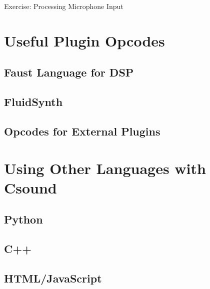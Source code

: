 \documentclass{beamer}
\begin{document}
        \begin{frame}{Exercise: Processing Microphone Input}
        \end{frame}
        
        \section{Useful Plugin Opcodes}
        \subsection{Faust Language for DSP}
        \subsection{FluidSynth}
        \subsection{Opcodes for External Plugins}
        \section{Using Other Languages with Csound}
        \subsection{Python}
        \subsection{C++}
        \subsection{HTML/JavaScript}
        
\end{document}
